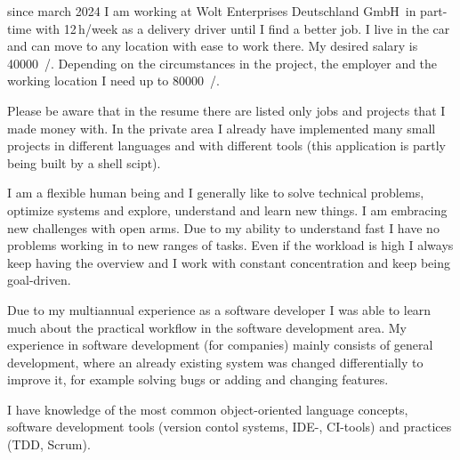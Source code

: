 \documentclass[fromphone,parskip=half]{scrlttr2}%
\newcommand\versionLanguageStart{}
\newcommand\versionLanguageEnd{}
\begin{document}
	\begin{letter}%
	{
		\addressReceiver
	}
		\opening{\joinList{\dear}{\genderReceiver}{\surnameReceiver}{,}}
\versionLanguageStart%
		since march 2024 I am working at \glqq Wolt Enterprises Deutschland GmbH\grqq\ in part-time with 12\,h/week as a delivery driver until I find a better job.
		I live in the car and can move to any location with ease to work there.
		My desired salary is \SI{40000}{\sieuro/\year}.
		Depending on the circumstances in the project, the employer and the working location I need up to \SI{80000}{\sieuro/\year}.
\versionLanguageEnd
		
		
\versionLanguageStart%
		Please be aware that in the resume there are listed only jobs and projects that I made money with.
		In the private area I already have implemented many small projects in different languages and with different tools (this application is partly being built by a shell scipt).
\versionLanguageEnd

\versionLanguageStart%
		I am a flexible human being and I generally like to solve technical problems, optimize systems and explore, understand and learn new things.
		I am embracing new challenges with open arms.
		Due to my ability to understand fast I have no problems working in to new ranges of tasks.
		Even if the workload is high I always keep having the overview and I work with constant concentration and keep being goal-driven.
\versionLanguageEnd
		
\versionLanguageStart%
		Due to my multiannual experience as a software developer I was able to learn much about the practical workflow in the software development area.
		My experience in software development (for companies) mainly consists of general development, where an already existing system was changed differentially to improve it, for example solving bugs or adding and changing features.
\versionLanguageEnd

\versionLanguageStart%
		I have knowledge of the most common object-oriented language concepts, software development tools (version contol systems, IDE-, CI-tools) and practices (TDD, Scrum).
\versionLanguageEnd


\end{letter}
\end{document}

